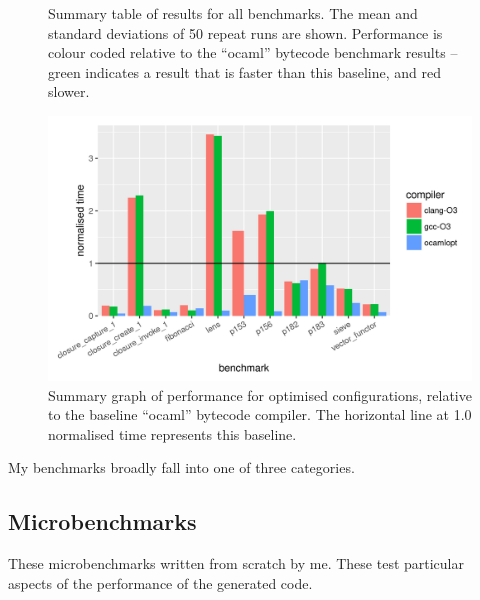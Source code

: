 \documentclass[12pt,a4paper,twoside,openright]{report}
\begin{document}
\begin{figure}[h]
\caption{Summary table of results for all benchmarks. The mean and standard deviations of 50 repeat runs are shown. Performance is colour coded relative to the ``ocaml'' bytecode benchmark results -- green indicates a result that is faster than this baseline, and red slower.}
\end{figure}

\begin{figure}
\centering
  \includegraphics[width=16cm]{resultsummary-b477d4580}

\caption{Summary graph of performance for optimised configurations, relative to
the baseline ``ocaml'' bytecode compiler. The horizontal line at 1.0 normalised
time represents this baseline.}\label{graph-summary}
\end{figure}

My benchmarks broadly fall into one of three categories.

\subsection{Microbenchmarks}
These microbenchmarks written from scratch by me. These test particular aspects
of the performance of the generated code.
\end{document}
